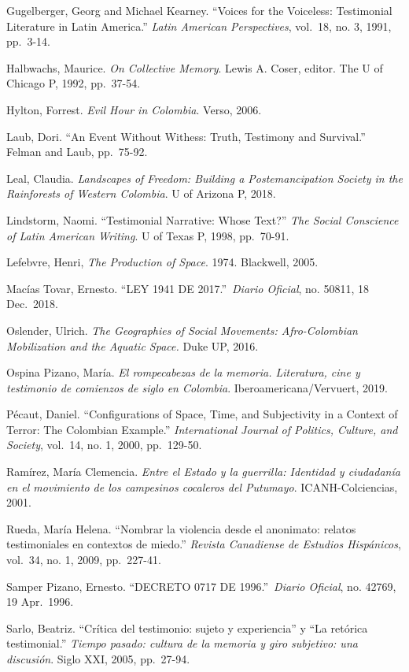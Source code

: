 \documentclass[
  11pt,
,
onecolumn,
openany
]{book}
\begin{document}
Gugelberger, Georg and Michael Kearney. ``Voices for the Voiceless:
Testimonial Literature in Latin America.'' \emph{Latin American Perspectives},
vol.~18, no. 3, 1991, pp.~3-14.

Halbwachs, Maurice. \emph{On Collective Memory}. Lewis A. Coser, editor. The U
of Chicago P, 1992, pp.~37-54.

Hylton, Forrest. \emph{Evil Hour in Colombia}. Verso, 2006.

Laub, Dori. ``An Event Without Withess: Truth, Testimony and Survival.''
Felman and Laub, pp.~75-92.

Leal, Claudia. \emph{Landscapes of Freedom: Building a Postemancipation
Society in the Rainforests of Western Colombia}. U of Arizona P, 2018.

Lindstorm, Naomi. ``Testimonial Narrative: Whose Text?'' \emph{The Social
Conscience of Latin American Writing}. U of Texas P, 1998, pp.~70-91.

Lefebvre, Henri, \emph{The Production of Space}. 1974. Blackwell, 2005.

Macías Tovar, Ernesto. ``LEY 1941 DE 2017.''~\emph{Diario Oficial}, no. 50811,
18 Dec.~2018.

Oslender, Ulrich. \emph{The Geographies of Social Movements: Afro-Colombian
Mobilization and the Aquatic Space.} Duke UP, 2016.

Ospina Pizano, María. \emph{El rompecabezas de la memoria. Literatura, cine y
testimonio de comienzos de siglo en Colombia}. Iberoamericana/Vervuert, 2019.

Pécaut, Daniel. ``Configurations of Space, Time, and Subjectivity in a Context
of Terror: The Colombian Example.'' \emph{International Journal of Politics,
Culture, and Society}, vol.~14, no. 1, 2000, pp.~129-50.

Ramírez, María Clemencia. \emph{Entre el Estado y la guerrilla: Identidad y
ciudadanía en el movimiento de los campesinos cocaleros del Putumayo}.
ICANH-Colciencias, 2001.~

Rueda, María Helena. ``Nombrar la violencia desde el anonimato: relatos
testimoniales en contextos de miedo.'' \emph{Revista Canadiense de Estudios
Hispánicos}, vol.~34, no. 1, 2009, pp.~227-41.

Samper Pizano, Ernesto. ``DECRETO 0717 DE 1996.''~\emph{Diario Oficial}, no.
42769, 19 Apr.~1996.

Sarlo, Beatriz. ``Crítica del testimonio: sujeto y experiencia'' y ``La
retórica testimonial.'' \emph{Tiempo pasado: cultura de la memoria y giro
subjetivo: una discusión}. Siglo XXI, 2005, pp.~27-94.
\end{document}

